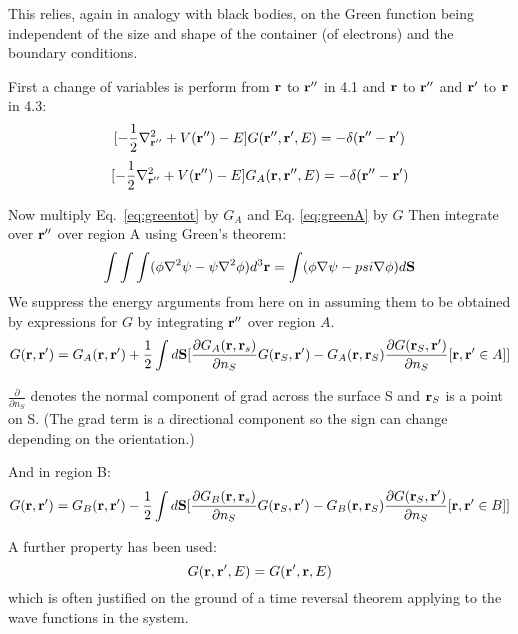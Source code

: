 \documentclass{article}
\def\r{{\bf r}}
\begin{document}
This relies, again in analogy with black bodies, on the Green
function being independent of the size and shape
of the container (of electrons) and the boundary conditions.

First a change of variables is perform from $\r$ to $\r''$ in 4.1 and $\r$ to $\r''$ and $\r'$
to $\r$ in 4.3:
%
\begin{equation}
\label{eq:greentot}
[-\frac{1}{2}\nabla^{2}_{\r''} + V(\r'') - E]G(\r'',\r',E)= -\delta(\r''-\r')
\end{equation}
%
\begin{equation}
\label{eq:greenA}
[-\frac{1}{2}\nabla^{2}_{\r''} + V(\r'') - E]G_{A}(\r,\r'',E)= -\delta(\r''-\r')
\end{equation}

Now multiply Eq.~\ref{eq:greentot} by $G_{A}$ and Eq.
\ref{eq:greenA} by $G$ Then integrate over $\r''$ over region A using
Green's theorem:
%
\begin{equation}
\label{eq:greenthm}
\int\int\int(\phi\nabla^{2}\psi - \psi\nabla^{2}\phi)d^{3}\r 
= \int(\phi\nabla\psi-psi\nabla\phi)d{\mathbf{S}}
\end{equation}
%
We suppress the energy arguments from here on in assuming them to be obtained by 
expressions for $G$ by integrating $\r''$ over region $A$.
%
\begin{equation}
\label{eq:green1a}
G(\r,\r') = G_{A}(\r,\r') + \frac{1}{2} \int d\mathbf{S} 
[\frac{\partial G_{A}(\r,\r_{s})}{\partial n_{S}}G(\r_{S},\r') - G_{A}(\r,\r_{S})\frac{\partial G(\r_{S},\r')}{\partial n_{S}} [\r, \r' \in A]]
\end{equation}

$\frac{\partial}{\partial n_{S}}$ denotes the normal component of grad across
the surface S and $\r_{S}$ is a point on S. (The grad term is a directional component
so the sign can change depending on the orientation.)

And in region B:
%
\begin{equation}
\label{eq:green1b}
G(\r,\r') = G_{B}(\r,\r') - \frac{1}{2} \int d\mathbf{S} 
[\frac{\partial G_{B}(\r,\r_{s})}{\partial n_{S}}G(\r_{S},\r')
- G_{B}(\r,\r_{S})\frac{\partial G(\r_{S},\r')}{\partial n_{S}} [\r, \r' \in B]]
\end{equation}
%

A further property has been used:
%
\begin{equation}
G(\r,\r',E) = G(\r',\r,E)
\end{equation}
%
which is often justified on the ground of a time reversal theorem applying 
to the wave functions in the system.
\end{document}
